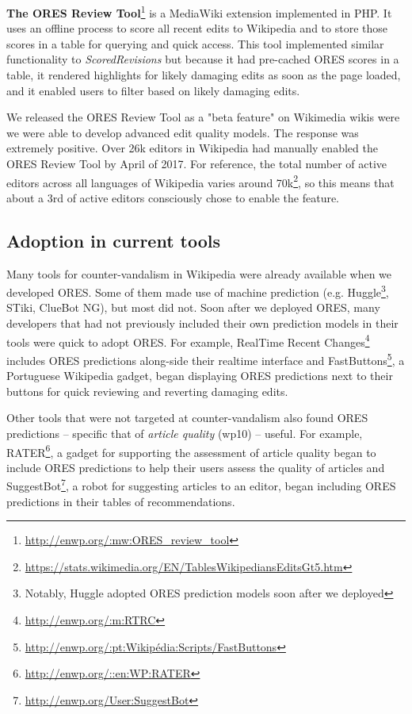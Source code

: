 \textbf{The ORES Review Tool}\footnote{\url{http://enwp.org/:mw:ORES_review_tool}} is a MediaWiki extension implemented in PHP.  It uses an offline process to score all recent edits to Wikipedia and to store those scores in a table for querying and quick access.  This tool implemented similar functionality to \emph{ScoredRevisions} but because it had pre-cached ORES scores in a table, it rendered highlights for likely damaging edits as soon as the page loaded, and it enabled users to filter based on likely damaging edits.

We released the ORES Review Tool as a "beta feature" on Wikimedia wikis were we were able to develop advanced edit quality models.  The response was extremely positive.  Over 26k editors in Wikipedia had manually enabled the ORES Review Tool by April of 2017.  For reference, the total number of active editors across all languages of Wikipedia varies around 70k\footnote{\url{https://stats.wikimedia.org/EN/TablesWikipediansEditsGt5.htm}}, so this means that about a 3rd of active editors consciously chose to enable the feature.

\subsection{Adoption in current tools}
Many tools for counter-vandalism in Wikipedia were already available when we developed ORES.  Some of them made use of machine prediction (e.g. Huggle\footnote{Notably, Huggle adopted ORES prediction models soon after we deployed}, STiki, ClueBot NG), but most did not.  Soon after we deployed ORES, many developers that had not previously included their own prediction models in their tools were quick to adopt ORES.  For example, RealTime Recent Changes\footnote{\url{http://enwp.org/:m:RTRC}} includes ORES predictions along-side their realtime interface and FastButtons\footnote{\url{http://enwp.org/:pt:Wikipédia:Scripts/FastButtons}}, a Portuguese Wikipedia gadget, began displaying ORES predictions next to their buttons for quick reviewing and reverting damaging edits.

Other tools that were not targeted at counter-vandalism also found ORES predictions -- specific that of \emph{article quality} (wp10) -- useful.  For example, RATER\footnote{\url{http://enwp.org/::en:WP:RATER}}, a gadget for supporting the assessment of article quality began to include ORES predictions to help their users assess the quality of articles and SuggestBot\footnote{\url{http://enwp.org/User:SuggestBot}}\cite{cosley2007suggestbot}, a robot for suggesting articles to an editor, began including ORES predictions in their tables of recommendations.

